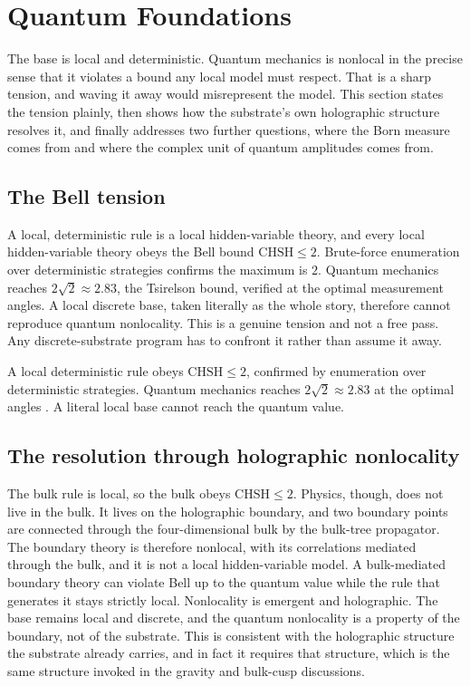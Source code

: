 \section{Quantum Foundations}

The base is local and deterministic. Quantum mechanics is nonlocal in the precise sense that it violates a bound any local model must respect. That is a sharp tension, and waving it away would misrepresent the model. This section states the tension plainly, then shows how the substrate's own holographic structure resolves it, and finally addresses two further questions, where the Born measure comes from and where the complex unit of quantum amplitudes comes from.

\subsection{The Bell tension}

A local, deterministic rule is a local hidden-variable theory, and every local hidden-variable theory obeys the Bell bound $\mathrm{CHSH} \le 2$. Brute-force enumeration over deterministic strategies confirms the maximum is $2$. Quantum mechanics reaches $2\sqrt{2} \approx 2.83$, the Tsirelson bound, verified at the optimal measurement angles. A local discrete base, taken literally as the whole story, therefore cannot reproduce quantum nonlocality. This is a genuine tension and not a free pass. Any discrete-substrate program has to confront it rather than assume it away.

\begin{result}
A local deterministic rule obeys $\mathrm{CHSH} \le 2$, confirmed by enumeration over deterministic strategies. Quantum mechanics reaches $2\sqrt{2} \approx 2.83$ at the optimal angles \cite{pollard2026vibetest, bell1964, clauserhorne1969}. A literal local base cannot reach the quantum value.
\end{result}

\subsection{The resolution through holographic nonlocality}

The bulk rule is local, so the bulk obeys $\mathrm{CHSH} \le 2$. Physics, though, does not live in the bulk. It lives on the holographic boundary, and two boundary points are connected through the four-dimensional bulk by the bulk-tree propagator. The boundary theory is therefore nonlocal, with its correlations mediated through the bulk, and it is not a local hidden-variable model. A bulk-mediated boundary theory can violate Bell up to the quantum value while the rule that generates it stays strictly local. Nonlocality is emergent and holographic. The base remains local and discrete, and the quantum nonlocality is a property of the boundary, not of the substrate. This is consistent with the holographic structure the substrate already carries, and in fact it requires that structure, which is the same structure invoked in the gravity and bulk-cusp discussions.

